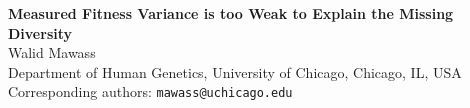 \documentclass{article}
\newcommand{\beginsupplement}{%
    \setcounter{figure}{0}%
    \renewcommand{\thefigure}{S\arabic{figure}}%
}
\begin{document}
\linenumbers

\begin{center}
    \LARGE
    \textbf{Measured Fitness Variance is too Weak to Explain the Missing Diversity }\\
    \vspace{0.25cm}  
    \Large
    \vspace{0.1cm}
    Walid Mawass\\
    \vspace{0.1cm}
    Department of Human Genetics, University of Chicago, Chicago, IL, USA\\
    \vspace{0.1cm}
    Corresponding authors: \texttt{mawass@uchicago.edu}\\
\end{center}








\printbibliography
\beginsupplement
\appendix  




%
\end{document}
